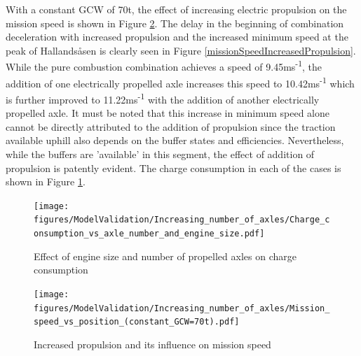 \documentclass[ExampleMasters.tex]{subfiles}
\begin{document}
With a constant GCW of 70t, the effect of increasing electric propulsion on the mission speed is shown in Figure \ref{globalMissionSpeedIncreasedPropulsion}. The delay in the beginning of combination deceleration with increased propulsion and the increased minimum speed at the peak of Hallands\aa sen is clearly seen in Figure \ref{missionSpeedIncreasedPropulsion}. While the pure combustion combination achieves a speed of 9.45ms\textsuperscript{-1}, the addition of one electrically propelled axle increases this speed to 10.42ms\textsuperscript{-1} which is further improved to 11.22ms\textsuperscript{-1} with the addition of another electrically propelled axle. It must be noted that this increase in minimum speed alone cannot be directly attributed to the addition of propulsion since the traction available uphill also depends on the buffer states and efficiencies. Nevertheless, while the buffers are 'available' in this segment, the effect of addition of propulsion is patently evident. The charge consumption in each of the cases is shown in Figure \ref{chargeEngineSizeNumberOfAxles}.\\

\begin{figure}[h!]
\centering
\texttt{[image: figures/ModelValidation/Increasing\_number\_of\_axles/Charge\_consumption\_vs\_axle\_number\_and\_engine\_size.pdf]}
\caption{Effect of engine size and number of propelled axles on charge consumption}
\label{chargeEngineSizeNumberOfAxles}
\end{figure}

\begin{figure}[h!]
\centering
\texttt{[image: figures/ModelValidation/Increasing\_number\_of\_axles/Mission\_speed\_vs\_position\_(constant\_GCW=70t).pdf]}
\caption{Increased propulsion and its influence on mission speed}
\label{globalMissionSpeedIncreasedPropulsion}
\end{figure}
\end{document}
